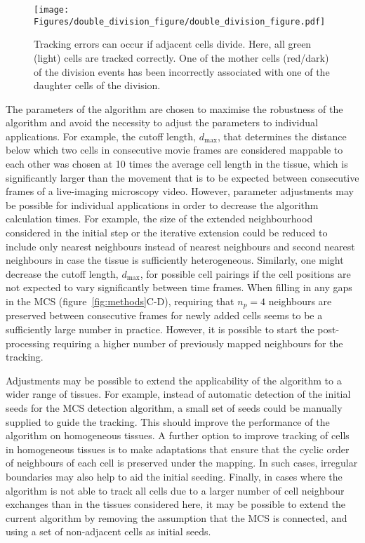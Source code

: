\documentclass[a4paper,11pt]{article}
\begin{document}
\begin{figure}[h!]
\centering
\texttt{[image: Figures/double\_division\_figure/double\_division\_figure.pdf]}
\caption{Tracking errors can occur if adjacent cells divide. Here, all green (light) cells are tracked correctly. One of the mother cells (red/dark) of the division events has been incorrectly associated with one of the daughter cells of the division.}
\label{fig:adjacent_divisions}
\end{figure}


The parameters of the algorithm are chosen to maximise the robustness of the algorithm and avoid the necessity to adjust the parameters to individual applications.
For example, the cutoff length, $d_{\mathrm{max}}$, that determines the distance below which two cells in consecutive movie frames are considered mappable to each other was chosen at 10 times the average cell length in the tissue, which is significantly larger than the movement that is to be expected between consecutive frames of a live-imaging microscopy video.
However, parameter adjustments may be possible for individual applications in order to decrease the algorithm calculation times.
For example, the size of the extended neighbourhood considered in the initial step or the iterative extension could be reduced to include only nearest neighbours instead of nearest neighbours and second nearest neighbours in case the tissue is sufficiently heterogeneous.
Similarly, one might decrease the cutoff length, $d_\mathrm{max}$, for possible cell pairings if the cell positions are not expected to vary significantly between time frames. 
When filling in any gaps in the MCS (figure~\ref{fig:methods}C-D), requiring that $n_{p} = 4$ neighbours are preserved between consecutive frames for newly added cells seems to be a sufficiently large number in practice. 
However, it is possible to start the post-processing requiring a higher number of previously mapped neighbours for the tracking.

Adjustments may be possible to extend the applicability of the algorithm to a wider range of tissues. 
For example, instead of automatic detection of the initial seeds for the MCS detection algorithm, a small set of seeds could be manually supplied to guide the tracking. 
This should improve the performance of the algorithm on homogeneous tissues. 
A further option to improve tracking of cells in homogeneous tissues is to make adaptations that ensure that the cyclic order of neighbours of each cell is preserved under the mapping. 
In such cases, irregular boundaries may also help to aid the initial seeding. 
Finally, in cases where the algorithm is not able to track all cells due to a larger number of cell neighbour exchanges than in the tissues considered here, it may be possible to extend the current algorithm by removing the assumption that the MCS is connected, and using a set of non-adjacent cells as initial seeds.
\end{document}
